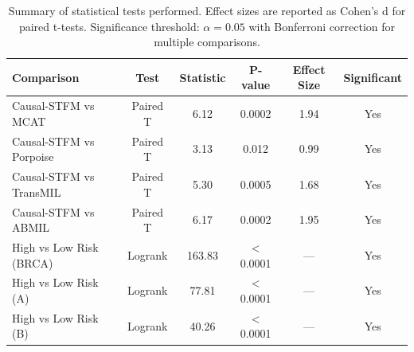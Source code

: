 \begin{table}[htbp]
\centering
\small
\caption{Summary of statistical tests performed. Effect sizes are reported as Cohen's d for paired t-tests. Significance threshold: $\alpha = 0.05$ with Bonferroni correction for multiple comparisons.}
\label{tab:statistics}
\begin{tabular}{lccccc}
\toprule
\textbf{Comparison} & \textbf{Test} & \textbf{Statistic} & \textbf{P-value} & \textbf{Effect Size} & \textbf{Significant} \\
\midrule
Causal-STFM vs MCAT & Paired T & 6.12 & 0.0002 & 1.94 & Yes \\
\addlinespace[0.5ex]
Causal-STFM vs Porpoise & Paired T & 3.13 & 0.012 & 0.99 & Yes \\
\addlinespace[0.5ex]
Causal-STFM vs TransMIL & Paired T & 5.30 & 0.0005 & 1.68 & Yes \\
\addlinespace[0.5ex]
Causal-STFM vs ABMIL & Paired T & 6.17 & 0.0002 & 1.95 & Yes \\
\addlinespace[0.5ex]
High vs Low Risk (BRCA) & Logrank & 163.83 & < 0.0001 & — & Yes \\
\addlinespace[0.5ex]
High vs Low Risk (A) & Logrank & 77.81 & < 0.0001 & — & Yes \\
\addlinespace[0.5ex]
High vs Low Risk (B) & Logrank & 40.26 & < 0.0001 & — & Yes \\
\bottomrule
\end{tabular}
\end{table}